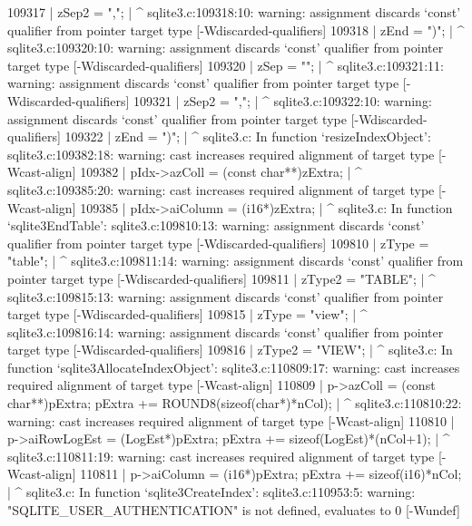 {{{{{{{{{{{{{{{{109317 |     zSep2 = ",";
       |           ^
sqlite3.c:109318:10: warning: assignment discards ‘const’ qualifier from pointer target type [-Wdiscarded-qualifiers]
109318 |     zEnd = ")";
       |          ^
sqlite3.c:109320:10: warning: assignment discards ‘const’ qualifier from pointer target type [-Wdiscarded-qualifiers]
109320 |     zSep = "\n  ";
       |          ^
sqlite3.c:109321:11: warning: assignment discards ‘const’ qualifier from pointer target type [-Wdiscarded-qualifiers]
109321 |     zSep2 = ",\n  ";
       |           ^
sqlite3.c:109322:10: warning: assignment discards ‘const’ qualifier from pointer target type [-Wdiscarded-qualifiers]
109322 |     zEnd = "\n)";
       |          ^
sqlite3.c: In function ‘resizeIndexObject’:
sqlite3.c:109382:18: warning: cast increases required alignment of target type [-Wcast-align]
109382 |   pIdx->azColl = (const char**)zExtra;
       |                  ^
sqlite3.c:109385:20: warning: cast increases required alignment of target type [-Wcast-align]
109385 |   pIdx->aiColumn = (i16*)zExtra;
       |                    ^
sqlite3.c: In function ‘sqlite3EndTable’:
sqlite3.c:109810:13: warning: assignment discards ‘const’ qualifier from pointer target type [-Wdiscarded-qualifiers]
109810 |       zType = "table";
       |             ^
sqlite3.c:109811:14: warning: assignment discards ‘const’ qualifier from pointer target type [-Wdiscarded-qualifiers]
109811 |       zType2 = "TABLE";
       |              ^
sqlite3.c:109815:13: warning: assignment discards ‘const’ qualifier from pointer target type [-Wdiscarded-qualifiers]
109815 |       zType = "view";
       |             ^
sqlite3.c:109816:14: warning: assignment discards ‘const’ qualifier from pointer target type [-Wdiscarded-qualifiers]
109816 |       zType2 = "VIEW";
       |              ^
sqlite3.c: In function ‘sqlite3AllocateIndexObject’:
sqlite3.c:110809:17: warning: cast increases required alignment of target type [-Wcast-align]
110809 |     p->azColl = (const char**)pExtra; pExtra += ROUND8(sizeof(char*)*nCol);
       |                 ^
sqlite3.c:110810:22: warning: cast increases required alignment of target type [-Wcast-align]
110810 |     p->aiRowLogEst = (LogEst*)pExtra; pExtra += sizeof(LogEst)*(nCol+1);
       |                      ^
sqlite3.c:110811:19: warning: cast increases required alignment of target type [-Wcast-align]
110811 |     p->aiColumn = (i16*)pExtra;       pExtra += sizeof(i16)*nCol;
       |                   ^
sqlite3.c: In function ‘sqlite3CreateIndex’:
sqlite3.c:110953:5: warning: "SQLITE_USER_AUTHENTICATION" is not defined, evaluates to 0 [-Wundef]
}}}}}}}}}}}}}}}}
